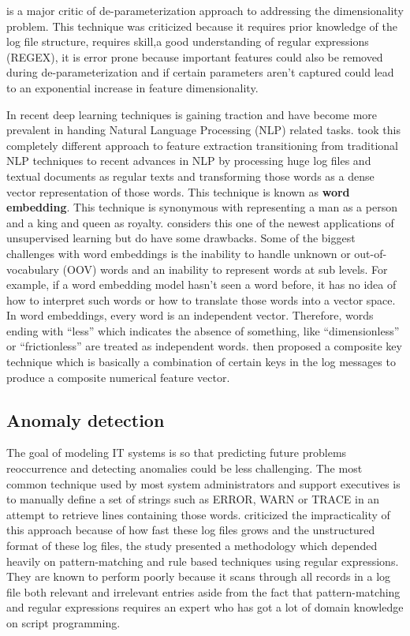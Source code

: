 \documentclass[12pt, letterpaper, titlepage]{report}
\begin{document}
\cite{xu2009detecting} is a major critic of de-parameterization approach to addressing the dimensionality problem. This technique was criticized because it requires prior knowledge of the log file structure, requires skill,a good understanding of regular expressions (REGEX), it is error prone because important features could also be removed during de-parameterization and if certain parameters aren’t captured could lead to an exponential increase in feature dimensionality. 

In recent deep learning techniques is gaining traction and have become more prevalent in handing Natural Language Processing (NLP) related tasks.  \cite{bertero2017experience} took this completely different approach to feature extraction transitioning from traditional NLP techniques to recent advances in NLP by processing huge log files and textual documents as regular texts and transforming those words as a dense vector representation of those words. This technique is known as \textbf{word embedding}. This technique is synonymous with representing a man as a person and a king and queen as royalty. \cite{ruder2016overview} considers this one of the newest applications of unsupervised learning but do have some drawbacks. Some of the biggest challenges with word embeddings is the inability to handle unknown or out-of-vocabulary (OOV) words and an inability to represent words at sub levels. For example, if a word embedding model hasn’t seen a word before, it has no idea of how to interpret such words or how to translate those words into a vector space. In word embeddings, every word is an independent vector. Therefore, words ending with “less” which indicates the absence of something, like “dimensionless” or “frictionless” are treated as independent words.\cite{xu2009detecting} then proposed a composite key technique which is basically a combination of certain keys in the log messages to produce a composite numerical feature vector.  

\subsection{Anomaly detection}
The goal of modeling IT systems is so that predicting future problems reoccurrence and detecting anomalies could be less challenging. The most common technique used by most system administrators and support executives is to manually define a set of strings such as ERROR, WARN or TRACE in an attempt to retrieve lines containing those words. \cite{mariani2008automated} criticized the impracticality of this approach because of how fast these log files grows and the unstructured format of these log files, the study presented a methodology which depended heavily on pattern-matching and rule based techniques using regular expressions. They are known to perform poorly because it scans through all records in a log file both relevant and irrelevant entries aside from the fact that pattern-matching and regular expressions requires an expert who has got a lot of domain knowledge on script programming. 
\end{document}
